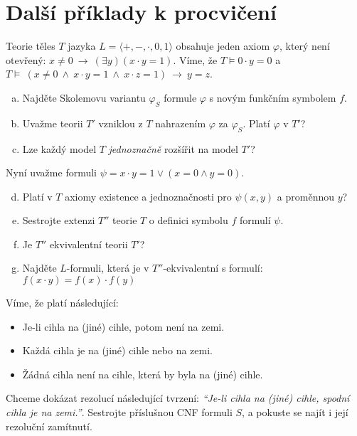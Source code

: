         
\section*{Další příklady k procvičení}


\begin{problem}

    Teorie těles $T$ jazyka $L=\langle +,-,\cdot,0,1\rangle$ obsahuje jeden axiom $\varphi$, který není otevřený: $x\neq 0\ \to\ (\exists y)(x\cdot y=1)$. Víme, že $T\models 0\cdot y=0$ a $T\models\ (x\ne 0\ \wedge\ x\cdot y=1\ \wedge\ x\cdot z=1)\ \to\ y=z$.
    \begin{enumerate}[(a)]
        \item Najděte Skolemovu variantu $\varphi_S$ formule $\varphi$ s novým funkčním symbolem $f$.
        \item Uvažme teorii $T'$ vzniklou z $T$ nahrazením $\varphi$ za $\varphi_S$. Platí $\varphi$ v $T'$?
        \item Lze každý model $T$ \emph{jednoznačně} rozšířit na model $T'$?
    \end{enumerate}
    Nyní uvažme formuli $\psi=x\cdot y=1\vee  (x=0 \wedge y=0)$.
    \begin{enumerate}[(a)]
        \setcounter{enumi}{3}
        \item Platí v $T$ axiomy existence a jednoznačnosti pro $\psi(x,y)$ a proměnnou $y$?
        \item Sestrojte extenzi $T''$ teorie $T$ o definici symbolu $f$ formulí $\psi$.
        \item Je $T''$ ekvivalentní teorii $T'$?
        \item Najděte $L$-formuli, která je v $T''$-ekvivalentní s formulí:
        $f(x\cdot y)=f(x)\cdot f(y)$
    \end{enumerate}

\end{problem}


\medskip\begin{problem} Víme, že platí následující:
    \begin{itemize}\it
        \item Je-li cihla na (jiné) cihle, potom není na zemi.
        \item Každá cihla je na (jiné) cihle nebo na zemi.
        \item Žádná cihla není na cihle, která by byla na (jiné) cihle.
    \end{itemize}
    Chceme dokázat rezolucí následující tvrzení: {\it ``Je-li cihla na (jiné) cihle, spodní cihla je na zemi.''}. Sestrojte příslušnou CNF formuli $S$, a pokuste se najít i její rezoluční zamítnutí.
\end{problem}

